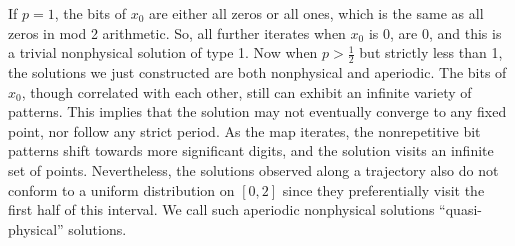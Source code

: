 If $p = 1$, the bits of $x_0$ are either all zeros or all ones, which is the same as all zeros in mod 2 arithmetic. So, all further iterates when $x_0$ is 0, are 0, and this is a trivial nonphysical solution of type 1.  Now when $p > \frac12$ but strictly less than 1, 
the solutions we just constructed are both nonphysical and aperiodic.
The bits of $x_0$, though correlated with each other,
still can exhibit an infinite variety of patterns. 
This implies that the solution may not eventually converge to 
any fixed point, nor follow any strict period.  
 As the map iterates, the nonrepetitive bit patterns
shift towards more significant digits, and the solution visits an infinite set of
points. 
 Nevertheless, the solutions observed along a trajectory also 
 do not conform to a uniform distribution on $[0,2]$ since they 
 preferentially visit the first half of this interval.
We call such aperiodic nonphysical solutions ``quasi-physical'' solutions.

